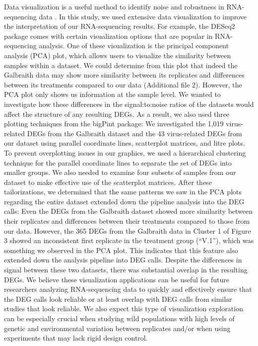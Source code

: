\documentclass{bmcart}
\begin{document}
\begin{linenumbers}
\begin{doublespacing}
Data visualization is a useful method to identify noise and robustness in RNA-sequencing data \cite{edger}. In this study, we used extensive data visualization to improve the interpretation of our RNA-sequencing results. For example, the DESeq2 package comes with certain visualization options that are popular in RNA-sequencing analysis. One of these visualization is the principal component analysis (PCA) plot, which allows users to visualize the similarity between samples within a dataset. We could determine from this plot that indeed the Galbraith data may show more similarity between its replicates and differences between its treatments compared to our data (Additional file 2). However, the PCA plot only shows us information at the sample level. We wanted to investigate how these differences in the signal:to:noise ratios of the datasets would affect the structure of any resulting DEGs. As a result, we also used three plotting techniques from the bigPint package: We investigated the 1,019 virus-related DEGs from the Galbraith dataset and the 43 virus-related DEGs from our dataset using parallel coordinate lines, scatterplot matrices, and litre plots. To prevent overplotting issues in our graphics, we used a hierarchical clustering technique for the parallel coordinate lines to separate the set of DEGs into smaller groups. We also needed to examine four subsets of samples from our dataset to make effective use of the scatterplot matrices. After these tailorizations, we determined that the same patterns we saw in the PCA plots regarding the entire dataset extended down the pipeline analysis into the DEG calls: Even the DEGs from the Galbraith dataset showed more similarity between their replicates and differences between their treatments compared to those from our data. However, the 365 DEGs from the Galbraith data in Cluster 1 of Figure 3 showed an inconsistent first replicate in the treatment group (``V.1''), which was something we observed in the PCA plot. This indicates that this feature also extended down the analysis pipeline into DEG calls. Despite the differences in signal between these two datasets, there was substantial overlap in the resulting DEGs. We believe these visualization applications can be useful for future researchers analyzing RNA-sequencing data to quickly and effectively ensure that the DEG calls look reliable or at least overlap with DEG calls from similar studies that look reliable. We also expect this type of visualization exploration can be especially crucial when studying wild populations with high levels of genetic and environmental variation between replicates and/or when using experiments that may lack rigid design control.


\end{doublespacing}
\end{linenumbers}
\end{document}
